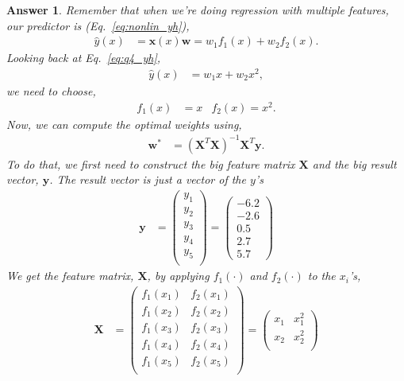 \documentclass{article}
\newtheorem{answer}{Answer}
\newcommand{\bracket}[3]{\left#1 #3 \right#2}
\renewcommand{\b}{\bracket{(}{)}}
\newcommand{\x}{\mathbf{x}}
\newcommand{\y}{\mathbf{y}}
\newcommand{\X}{\mathbf{X}}
\newcommand{\w}{\mathbf{w}}
\newcommand{\wo}{\w^*}
\begin{document}
\begin{answer}
  Remember that when we're doing regression with multiple features, our predictor is (Eq.~\ref{eq:nonlin_yh}),
  \begin{align}
    \hat{y}(x) &= \x(x) \w = w_1 f_1(x) + w_2 f_2(x).
  \end{align}
  Looking back at Eq.~\eqref{eq:q4_yh},
  \begin{align}
    \hat{y}(x) &= w_1 x + w_2 x^2,
  \end{align}
  we need to choose,
  \begin{align}
    f_1(x) & = x & f_2(x) = x^2.
  \end{align}
  Now, we can compute the optimal weights using,
  \begin{align}
    \wo &= \b{\X^T \X}^{-1} \X^T \y.
  \end{align}
  To do that, we first need to construct the big feature matrix $\X$ and the big result vector, $\y$.
  The result vector is just a vector of the $y$'s
  \begin{align}
    \y &= \begin{pmatrix}
      y_1\\
      y_2\\
      y_3\\
      y_4\\
      y_5\\
    \end{pmatrix}
    = \begin{pmatrix}
      -6.2\\
      -2.6\\
       0.5\\
       2.7\\
       5.7
    \end{pmatrix}
  \end{align}
  We get the feature matrix, $\X$, by applying $f_1(\cdot)$ and $f_2(\cdot)$ to the $x_i$'s,
  \begin{align}
    \X &= \begin{pmatrix}
      f_1(x_1) & f_2(x_1)\\
      f_1(x_2) & f_2(x_2)\\
      f_1(x_3) & f_2(x_3)\\
      f_1(x_4) & f_2(x_4)\\
      f_1(x_5) & f_2(x_5)\\
    \end{pmatrix}
    = \begin{pmatrix}
      x_1 & x_1^2\\
      x_2 & x_2^2\\

\end{pmatrix}
\end{align}
\end{answer}
\end{document}
